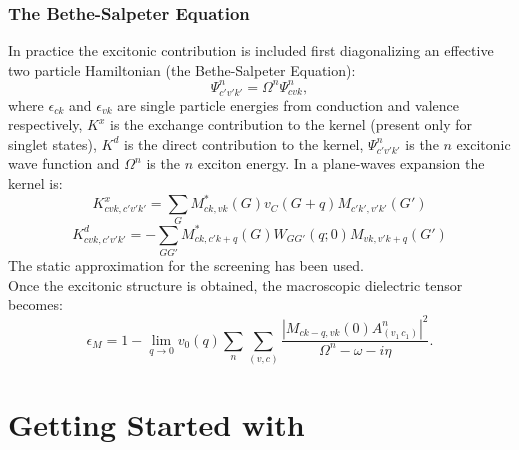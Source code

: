 \documentclass[11pt]{article}
\begin{document}
\subsubsection{The Bethe-Salpeter Equation}
In practice the excitonic contribution is included first diagonalizing an effective two particle Hamiltonian
(the Bethe-Salpeter Equation):
\begin{equation}
[(\epsilon_{ck}-\epsilon_{vk})\delta_{cc'}\delta_{vv'}\delta_{kk'}+K^x_{cvk,c'v'k'}+K^d_{cvk,c'v'k'}]\Psi^n_{c'v'k'}=
\Omega^n\Psi^n_{cvk},
\end{equation}
where $\epsilon_{ck}$ and $\epsilon_{vk}$ are single particle energies from 
conduction and valence respectively, $K^x$ is
the exchange contribution to the kernel (present only for singlet states), $K^d$ is the direct 
contribution to the kernel, $\Psi^n_{c'v'k'}$ 
is the $n$ excitonic wave function and $\Omega^n$ is the $n$ exciton energy. 
In a plane-waves expansion the kernel is:
\begin{equation}
K^x_{cvk,c'v'k'}=\sum_{G} M^*_{ck,vk}(G) v_C(G+q) M_{c'k',v'k'}(G')
\end{equation}
\begin{equation}
K^d_{cvk,c'v'k'}=-\sum_{GG'} M^*_{ck,c'k+q}(G) W_{GG'}(q;0) M_{vk,v'k+q}(G')
\end{equation}
The static approximation for the screening has been used.
\\
Once the excitonic structure is obtained, the macroscopic dielectric tensor becomes:
\begin{equation}
\epsilon_{M} = 1 - \lim_{q\to0}v_{0}(q)\sum_{n}
\sum_{(v,c)}\frac{ |M_{ck-q,vk}(0)  A^n_{(v_{1}\,c_{1})}|^{2} }{\Omega^n - \omega -i\eta}.
\end{equation}

\clearpage

\section{Getting Started with \SAX}
\end{document}
